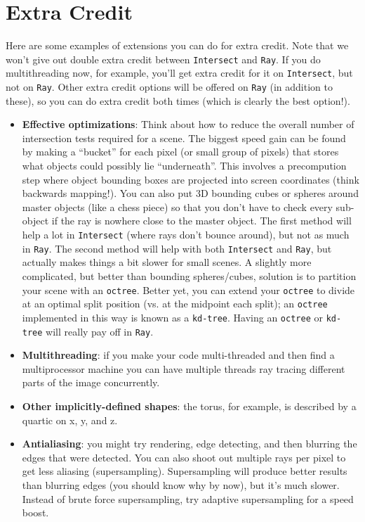 \documentclass[10pt,twocolumn]{article}
\begin{document}
{\section{Extra Credit}
Here are some examples of extensions you can do for extra credit. Note that we won't give out double extra credit between {\tt Intersect} and {\tt Ray}. If you do multithreading now, for example, you'll get extra credit for it on {\tt Intersect}, but not on {\tt Ray}. Other extra credit options will be offered on {\tt Ray} (in addition to these), so you can do extra credit both times (which is clearly the best option!).
\begin{itemize}
\item {\bf Effective optimizations}: Think about how to reduce the overall number of intersection tests required for a scene. The biggest speed gain can be found by making a ``bucket'' for each pixel (or small group of pixels) that stores what objects could possibly lie ``underneath''. This involves a precompution step where object bounding boxes are projected into screen coordinates (think backwards mapping!). You can also put 3D bounding cubes or spheres around master objects (like a chess piece) so that you don't have to check every sub-object if the ray is nowhere close to the master object. The first method will help a lot in {\tt Intersect} (where rays don't bounce around), but not as much in {\tt Ray}. The second method will help with both {\tt Intersect} and {\tt Ray}, but actually makes things a bit slower for small scenes. A slightly more complicated, but better than bounding spheres/cubes, solution is to partition your scene with an {\tt octree}. Better yet, you can extend your {\tt octree} to divide at an optimal split position (vs. at the midpoint each split); an {\tt octree} implemented in this way is known as a {\tt kd-tree}. Having an {\tt octree} or {\tt kd-tree} will really pay off in {\tt Ray}.

\item {\bf Multithreading}: if you make your code multi-threaded and then find a multiprocessor machine you can have multiple threads ray tracing different parts of the image concurrently.

\item {\bf Other implicitly-defined shapes}: the torus, for example, is described by a quartic on x, y, and z.

\item {\bf Antialiasing}: you might try rendering, edge detecting, and then blurring the edges that were detected. You can also shoot out multiple rays per pixel to get less aliasing (supersampling). Supersampling will produce better results than blurring edges (you should know why by now), but it's much slower. Instead of brute force supersampling, try adaptive supersampling for a speed boost.


\end{itemize}}
\end{document}
